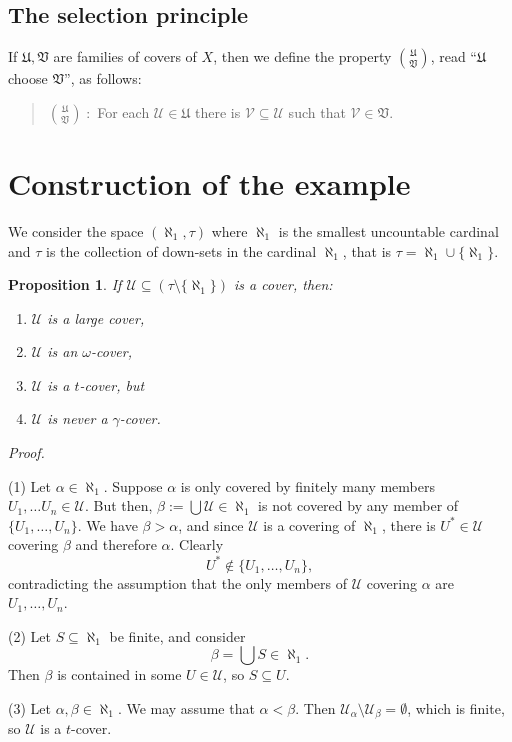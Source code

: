 \documentclass[12pt]{amsart}
\newtheorem{proposition}[lemma]{\bf Proposition}
\gdef\cal{\mathcal}
\gdef\frak{\mathfrak}
\gdef\a{\aleph_1}
\begin{document}
\subsection{The selection principle} If ${\mathfrak U}, {\mathfrak V}$ are
families of covers of $X$, then we define the property ${{\frak U}\choose
{\frak V}}$, read ``$\frak U$ choose $\frak V$'', as follows:

\begin{quote}
  ${{\frak U}\choose {\frak V}}\; :$ For each ${\cal U}\in {\frak U}$
  there is ${\cal V}\subseteq {\cal U}$ such that ${\cal V}\in {\frak V}$.
\end{quote}

\section{Construction of the example}
We consider the space $(\a, \tau)$ where $\a$ is the smallest
uncountable cardinal and $\tau$ is the collection of down-sets
in the cardinal $\a$, that is $\tau = \a\cup\{\a\}$.

\begin{proposition}\label{main}
  If ${\cal U}\subseteq (\tau \setminus \{\a\})$
  is a cover, then:
  \begin{enumerate}
    \item ${\cal U}$ is a large cover,
    \item ${\cal U}$ is an $\omega$-cover,
    \item ${\cal U}$ is a $t$-cover, but
    \item ${\cal U}$ is {\em never} a $\gamma$-cover.
  \end{enumerate}
\end{proposition}
{\it Proof.}

(1) Let $\alpha\in \a$. Suppose $\alpha$ is only covered by finitely
many members $U_1,\ldots U_n\in {\cal U}$. But then,
$\beta:=\bigcup{\cal U}\in \a$ is not covered by any member
of $\{U_1,\ldots, U_n\}$. We have $\beta > \alpha$, and since
${\cal U}$ is a covering of $\a$, there is $U^* \in {\cal U}$
covering $\beta$ and therefore $\alpha$. Clearly $$U^*\notin \{U_1,\ldots
, U_n\},$$ contradicting the assumption that the only members of
${\cal U}$ covering $\alpha$ are $U_1,\ldots, U_n$.

(2) Let $S\subseteq \a$ be finite, and consider
$$\beta = \bigcup S\in \a.$$ Then $\beta$ is contained in some
$U\in {\cal U}$, so $S \subseteq U$.

(3) Let $\alpha,\beta\in \a$. We may assume that $\alpha<\beta$.
Then ${\cal U}_\alpha\setminus
{\cal U}_\beta = \emptyset$, which is finite, so ${\cal U}$ is a
$t$-cover.
\end{document}

